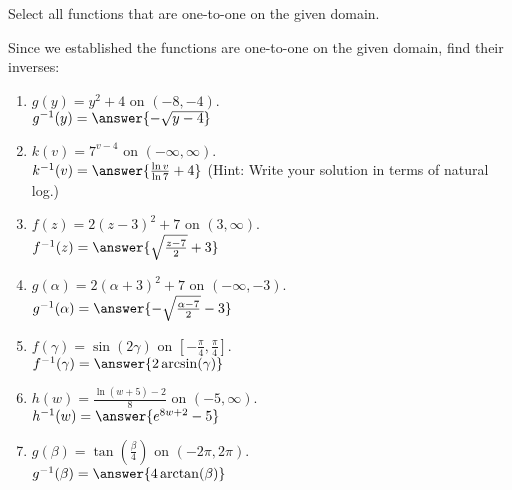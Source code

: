 \documentclass{ximera}
\author{Elizabeth Campolongo}
\begin{document}
\begin{exercise}
Select all functions that are one-to-one on the given domain.
%
\begin{selectAll}
\end{selectAll}

\begin{exercise}
Since we established the functions are one-to-one on the given domain, find their inverses:
\begin{enumerate}

\item $g(y) = y^2+4$ on $(-8,-4)$.\\
$g^{-1}(y) = \answer{-\sqrt{y-4}}$

\item $k(v) = 7^{v-4}$ on $(-\infty, \infty)$.\\
$k^{-1}(v) = \answer{\frac{\ln v}{\ln7} +4}$ (Hint: Write your solution in terms of natural log.)

\item $f(z) = 2(z-3)^2+7$ on $(3, \infty)$.\\
$f^{-1}(z) = \answer{\sqrt{\frac{z-7}{2}}+3}$

\item $g(\alpha) = 2(\alpha+3)^2+7$ on $(-\infty, -3)$.\\
$g^{-1}(\alpha) = \answer{-\sqrt{\frac{\alpha-7}{2}}-3}$

\item $f(\gamma) = \sin(2\gamma)$ on $\left[-\frac{\pi}{4}, \frac{\pi}{4} \right]$. \\
$f^{-1}(\gamma) = \answer{2\arcsin(\gamma)}$

\item $h(w) = \frac{\ln(w+5) - 2}{8}$ on $(-5,\infty)$. \\
$h^{-1}(w) = \answer{e^{8w+2}-5}$

\item $g(\beta)= \tan\left(\frac{\beta}{4}\right)$ on $(-2\pi,2\pi)$.\\
$g^{-1}(\beta) = \answer{4\arctan(\beta)}$

\end{enumerate}
\end{exercise}



\end{exercise}
\end{document}
